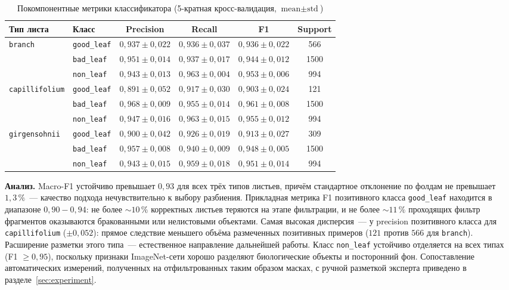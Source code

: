 \begin{table}[H]
\centering
\caption{Покомпонентные метрики классификатора (5-кратная кросс-валидация, $\text{mean} \pm \text{std}$)}
\label{tab:clf_per_class}
\small
\begin{tabular}{llcccc}
\hline
\textbf{Тип листа} & \textbf{Класс} & \textbf{Precision} & \textbf{Recall} & \textbf{F1} & \textbf{Support} \\
\hline
\multirow{3}{*}{\texttt{branch}}
    & \texttt{good\_leaf} & $0{,}937 \pm 0{,}022$ & $0{,}936 \pm 0{,}037$ & $0{,}936 \pm 0{,}022$ & 566  \\
    & \texttt{bad\_leaf}  & $0{,}951 \pm 0{,}014$ & $0{,}937 \pm 0{,}017$ & $0{,}944 \pm 0{,}012$ & 1500 \\
    & \texttt{non\_leaf}  & $0{,}943 \pm 0{,}013$ & $0{,}963 \pm 0{,}004$ & $0{,}953 \pm 0{,}006$ & 994  \\
\hline
\multirow{3}{*}{\texttt{capillifolium}}
    & \texttt{good\_leaf} & $0{,}891 \pm 0{,}052$ & $0{,}917 \pm 0{,}030$ & $0{,}903 \pm 0{,}024$ & 121  \\
    & \texttt{bad\_leaf}  & $0{,}968 \pm 0{,}009$ & $0{,}955 \pm 0{,}014$ & $0{,}961 \pm 0{,}008$ & 1500 \\
    & \texttt{non\_leaf}  & $0{,}947 \pm 0{,}016$ & $0{,}963 \pm 0{,}015$ & $0{,}955 \pm 0{,}012$ & 994  \\
\hline
\multirow{3}{*}{\texttt{girgensohnii}}
    & \texttt{good\_leaf} & $0{,}900 \pm 0{,}042$ & $0{,}926 \pm 0{,}019$ & $0{,}913 \pm 0{,}027$ & 309  \\
    & \texttt{bad\_leaf}  & $0{,}957 \pm 0{,}008$ & $0{,}940 \pm 0{,}009$ & $0{,}948 \pm 0{,}005$ & 1500 \\
    & \texttt{non\_leaf}  & $0{,}943 \pm 0{,}015$ & $0{,}959 \pm 0{,}018$ & $0{,}951 \pm 0{,}014$ & 994  \\
\hline
\end{tabular}
\end{table}

\textbf{Анализ.} Macro-F1 устойчиво превышает $0{,}93$ для всех трёх типов
листьев, причём стандартное отклонение по фолдам не превышает $1{,}3\,\%$~---
качество подхода нечувствительно к выбору разбиения. Прикладная метрика
F1 позитивного класса \texttt{good\_leaf} находится в диапазоне $0{,}90\!-\!0{,}94$:
не более $\sim 10\,\%$ корректных листьев теряются на этапе фильтрации, и
не более $\sim 11\,\%$ проходящих фильтр фрагментов оказываются бракованными или
нелистовыми объектами. Самая высокая дисперсия~--- у precision позитивного
класса для \texttt{capillifolium} ($\pm 0{,}052$): прямое следствие меньшего
объёма размеченных позитивных примеров ($121$ против $566$ для \texttt{branch}).
Расширение разметки этого типа~--- естественное направление дальнейшей работы.
Класс \texttt{non\_leaf} устойчиво отделяется на всех типах (F1 $\geq 0{,}95$),
поскольку признаки ImageNet-сети хорошо разделяют биологические объекты и
посторонний фон. Сопоставление автоматических измерений, полученных на
отфильтрованных таким образом масках, с ручной разметкой эксперта приведено
в разделе~\ref{sec:experiment}.

